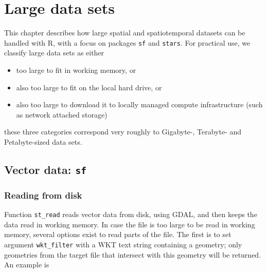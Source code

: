 \documentclass[]{book}
\providecommand{\tightlist}{%
  \setlength{\itemsep}{0pt}\setlength{\parskip}{0pt}}
\begin{document}
\hypertarget{large}{%
\chapter{Large data sets}\label{large}}

This chapter describes how large spatial and spatiotemporal datasets
can be handled with R, with a focus on packages \texttt{sf} and \texttt{stars}.
For practical use, we classify large data sets as either

\begin{itemize}
\tightlist
\item
  too large to fit in working memory, or
\item
  also too large to fit on the local hard drive, or
\item
  also too large to download it to locally managed compute
  infrastructure (such as network attached storage)
\end{itemize}

these three categories correspond very roughly to Gigabyte-,
Terabyte- and Petabyte-sized data sets.

\hypertarget{largesf}{%
\section{\texorpdfstring{Vector data: \texttt{sf}}{Vector data: sf}}\label{largesf}}

\hypertarget{reading-from-disk}{%
\subsection{Reading from disk}\label{reading-from-disk}}

Function \texttt{st\_read} reads vector data from disk, using GDAL, and
then keeps the data read in working memory. In case the file is
too large to be read in working memory, several options exist to
read parts of the file. The first is to set argument \texttt{wkt\_filter}
with a WKT text string containing a geometry; only geometries from
the target file that intersect with this geometry will be returned.
An example is
\end{document}
